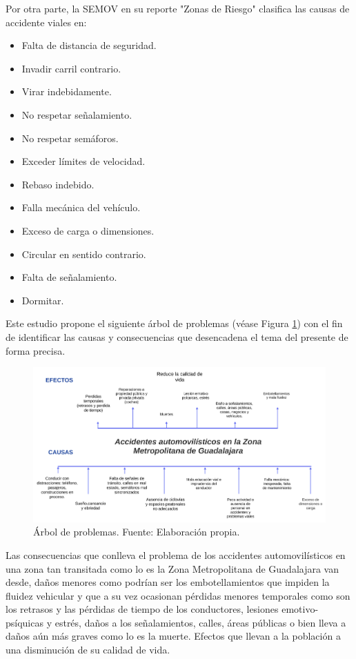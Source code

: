 \documentclass{article}
\begin{document}
Por otra parte, la SEMOV en su reporte "Zonas de Riesgo" clasifica las causas de accidente viales en:

	\begin{itemize}
		\item Falta de distancia de seguridad.
		\item Invadir carril contrario.
		\item Virar indebidamente.
		\item No respetar señalamiento.
		\item No respetar semáforos.
		\item Exceder límites de velocidad.
		\item Rebaso indebido.
		\item Falla mecánica del vehículo.
		\item Exceso de carga o dimensiones.
		\item Circular en sentido contrario.
		\item Falta de señalamiento.
		\item Dormitar.
	\end{itemize}


Este estudio propone el siguiente árbol de problemas (véase Figura \ref{fig:arbol}) con el fin de identificar las causas y consecuencias que desencadena el tema del presente de forma precisa.


	\begin{figure}[H]\centering
	\includegraphics[width=1\textwidth]{resources/img/arbol_de_problemas.png}
	\caption{\label{fig:arbol} Árbol de problemas. Fuente: Elaboración propia.}
    \end{figure}

Las consecuencias que conlleva el problema de los accidentes automovilísticos en una zona tan transitada como lo es la Zona Metropolitana de Guadalajara van desde, daños menores como podrían ser los embotellamientos que impiden la fluidez vehicular y que a su vez ocasionan pérdidas menores temporales como son los retrasos y las pérdidas de tiempo de los conductores, lesiones emotivo-psíquicas y estrés, daños a los señalamientos, calles, áreas públicas o bien lleva a daños aún más graves como lo es la muerte. Efectos que llevan a la población a una disminución de su calidad de vida.
\end{document}
